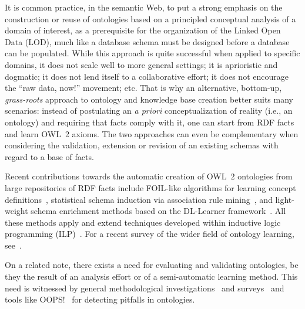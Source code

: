 \documentclass[conference]{IEEEtran}
\begin{document}
It is common practice, in the semantic Web, to put a strong emphasis
on the construction or reuse of ontologies based on a principled conceptual analysis
of a domain of interest, as a prerequisite for the organization of the Linked Open Data (LOD),
much like a database schema must be designed before a database can be populated.
While this approach is quite successful when applied to specific domains,
it does not scale well to more general settings;
it is aprioristic and dogmatic;
it does not lend itself to a collaborative effort; 
it does not encourage the ``raw data, now!'' movement; etc.
That is why an alternative, bottom-up, \emph{grass-roots} approach to ontology and
knowledge base creation better suits many scenarios: instead of postulating an \emph{a priori}
conceptualization of reality (i.e., an ontology) and requiring that facts comply with it, one can start from RDF facts and learn OWL~2 axioms. The two approaches can even be complementary when considering the validation, extension or revision of an existing schemas with regard to a base of facts.

Recent contributions towards the automatic creation of OWL~2 ontologies
from large repositories of RDF facts include
FOIL-like algorithms for learning concept definitions~\cite{FanizziDAmatoEsposito2008},
statistical schema induction via association rule mining~\cite{FleischhackerVoelkerStuckenschmidt2012},
and light-weight schema enrichment methods based on the DL-Learner
framework~\cite{HellmannLehmannAuer2009,BuehmannLehmann2012}.
All these methods apply and extend techniques developed within inductive logic programming
(ILP)~\cite{ILPat20}. For a recent survey of the wider field of ontology learning,
see~\cite{LehmannVoelker2014}.

On a related note, there exists a need for evaluating and validating ontologies,
be they the result of an analysis effort or of a semi-automatic learning method.
This need is witnessed by general methodological investigations~\cite{GangemiCatenacciCiaramitaLehmann2005,GangemiCatenacciCiaramitaLehmann2006}
and surveys~\cite{TartirBudakArpinarSheth2007} and tools like OOPS!~\cite{PovedaSuarezGomez2012}
for detecting pitfalls in ontologies.
\end{document}
